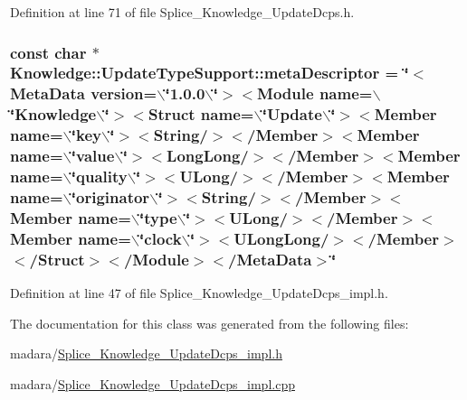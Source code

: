 Definition at line 71 of file Splice\_\-Knowledge\_\-UpdateDcps.h.

\hypertarget{classKnowledge_1_1UpdateTypeSupport_a647d28a536f6433afefc901995d57e40}{
\subsubsection[{metaDescriptor}]{\setlength{\rightskip}{0pt plus 5cm}const char $\ast$ {\bf Knowledge::UpdateTypeSupport::metaDescriptor} = \char`\"{}$<$MetaData version=$\backslash$\char`\"{}1.0.0$\backslash$\char`\"{}$>$$<$Module name=$\backslash$\char`\"{}Knowledge$\backslash$\char`\"{}$>$$<$Struct name=$\backslash$\char`\"{}Update$\backslash$\char`\"{}$>$$<$Member name=$\backslash$\char`\"{}key$\backslash$\char`\"{}$>$$<$String/$>$$<$/Member$>$$<$Member name=$\backslash$\char`\"{}value$\backslash$\char`\"{}$>$$<$LongLong/$>$$<$/Member$>$$<$Member name=$\backslash$\char`\"{}quality$\backslash$\char`\"{}$>$$<$ULong/$>$$<$/Member$>$$<$Member name=$\backslash$\char`\"{}originator$\backslash$\char`\"{}$>$$<$String/$>$$<$/Member$>$$<$Member name=$\backslash$\char`\"{}type$\backslash$\char`\"{}$>$$<$ULong/$>$$<$/Member$>$$<$Member name=$\backslash$\char`\"{}clock$\backslash$\char`\"{}$>$$<$ULongLong/$>$$<$/Member$>$$<$/Struct$>$$<$/Module$>$$<$/MetaData$>$\char`\"{}}}
\label{de/d96/classKnowledge_1_1UpdateTypeSupport_a647d28a536f6433afefc901995d57e40}


Definition at line 47 of file Splice\_\-Knowledge\_\-UpdateDcps\_\-impl.h.



The documentation for this class was generated from the following files:\begin{DoxyCompactItemize}
\item 
madara/\hyperlink{Splice__Knowledge__UpdateDcps__impl_8h}{Splice\_\-Knowledge\_\-UpdateDcps\_\-impl.h}\item 
madara/\hyperlink{Splice__Knowledge__UpdateDcps__impl_8cpp}{Splice\_\-Knowledge\_\-UpdateDcps\_\-impl.cpp}\end{DoxyCompactItemize}
